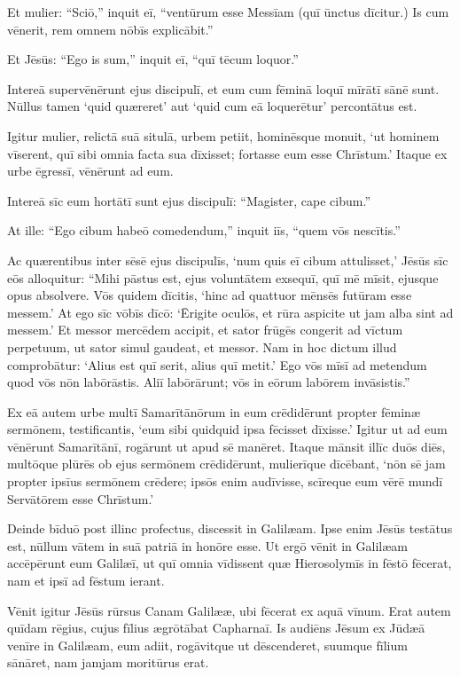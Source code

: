 \Versus Et mulier: ``Sciō,'' inquit eī, ``ventūrum esse Messīam (quī ūnctus dīcitur.) Is cum vēnerit, rem omnem nōbīs explicābit.''

\Versus Et Jēsūs: ``Ego is sum,'' inquit eī, ``quī tēcum loquor.''

\Versus Intereā supervēnērunt ejus discipulī, et eum cum fēminā loquī mīrātī sānē sunt. Nūllus tamen `quid quæreret' aut `quid cum eā loquerētur' percontātus est.

\Versus Igitur mulier, relictā suā situlā, urbem petiit, hominēsque monuit,
\Versus `ut hominem vīserent, quī sibi omnia facta sua dīxisset; fortasse eum esse Chrīstum.'
\Versus Itaque ex urbe ēgressī, vēnērunt ad eum.

\Versus Intereā sīc eum hortātī sunt ejus discipulī: ``Magister, cape cibum.''

\Versus At ille: ``Ego cibum habeō comedendum,'' inquit iīs, ``quem vōs nescītis.''

\Versus Ac quærentibus inter sēsē ejus discipulīs, `num quis eī cibum attulisset,'
\Versus Jēsūs sīc eōs alloquitur: ``Mihi pāstus est, ejus voluntātem exsequī, quī mē mīsit, ejusque opus absolvere.
\Versus Vōs quidem dīcitis, `hinc ad quattuor mēnsēs futūram esse messem.' At ego sīc vōbīs dīcō: `Ērigite oculōs, et rūra aspicite ut jam alba sint ad messem.'
\Versus Et messor mercēdem accipit, et sator frūgēs congerit ad vīctum perpetuum, ut sator simul gaudeat, et messor.
\Versus Nam in hoc dictum illud comprobātur: `Alius est quī serit, alius quī metit.'
\Versus Ego vōs mīsī ad metendum quod vōs nōn labōrāstis. Aliī labōrārunt; vōs in eōrum labōrem invāsistis.''

\Versus Ex eā autem urbe multī Samarītānōrum in eum crēdidērunt propter fēminæ sermōnem, testificantis, `eum sibi quidquid ipsa fēcisset dīxisse.'
\Versus Igitur ut ad eum vēnērunt Samarītānī, rogārunt ut apud sē manēret. Itaque mānsit illīc duōs diēs,
\Versus multōque plūrēs ob ejus sermōnem crēdidērunt,
\Versus mulierīque dīcēbant, `nōn sē jam propter ipsīus sermōnem crēdere; ipsōs enim audīvisse, scīreque eum vērē mundī Servātōrem esse Chrīstum.'

\Versus Deinde bīduō post illinc profectus, discessit in Galilæam.
\Versus Ipse enim Jēsūs testātus est, nūllum vātem in suā patriā in honōre esse.
\Versus Ut ergō vēnit in Galilæam accēpērunt eum Galilæī, ut quī omnia vīdissent quæ Hierosolymīs in fēstō fēcerat, nam et ipsī ad fēstum ierant.

\Versus Vēnit igitur Jēsūs rūrsus Canam Galilææ, ubi fēcerat ex aquā vīnum. Erat autem quīdam rēgius, cujus fīlius ægrōtābat Capharnaī.
\Versus Is audiēns Jēsum ex Jūdæā venīre in Galilæam, eum adiit, rogāvitque ut dēscenderet, suumque fīlium sānāret, nam jamjam moritūrus erat.

